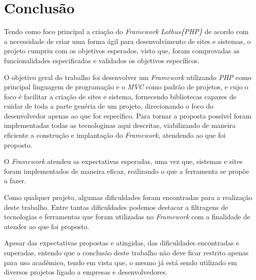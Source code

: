 \chapter{Conclusão\label{cap:conclusao}}
    Tendo como foco principal a criação do \emph{Framework Lothus\{PHP\}} de acordo com a necessidade de criar uma forma ágil para desenvolvimento de sites e sistemas, o projeto cumpriu com os objetivos esperados, visto que, foram comprovadas as funcionalidades especificadas e validados os objetivos específicos.

    O objetivo geral do trabalho foi desenvolver um \emph{Framework} utilizando \emph{PHP} como principal linguagem de programação e o \emph{MVC} como padrão de projetos, e cujo o foco é facilitar a criação de sites e sistema, fornecendo bibliotecas capazes de cuidar de toda a parte genéria de um projeto, direcionando o foco do desenvolvedor apenas ao que for específico.
    Para tornar a proposta possível foram implementadas todas as tecnologinas aqui descritas, viabilizando de maneira eficiente a construção e implantação do \emph{Framework}, atendendo ao que foi proposto.

    O \emph{Framework} atendeu as expectativas esperadas, uma vez que, sistemas e sites foram implementados de maneira eficaz, realizando o que a ferramenta se propõe a fazer.

    Como qualquer projeto, algumas dificuldades foram encontradas para a realização deste trabalho. Entre tantas dificuldades podemos destacar a filtragens de tecnologias e ferramentas que foram utilizadas no \emph{Framework} com a finalidade de atender ao que foi proposto.

    Apesar das expectativas propostas e atingidas, das dificuldades encontradas e superadas, entendo que a conclusão deste trabalho não deve ficar restrito apenas para uso acadêmico, tendo em vista que, o mesmo já está sendo utilizado em diversos projetos ligado a empresas e desenvolvedores.

